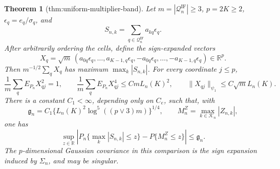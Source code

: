 \documentclass{article}
\newtheorem{theorem}{Theorem}
\begin{document}
\begin{theorem}[thm:uniform-multiplier-band]\label{thm:uniform-multiplier-band}
Let \(m=|\mathcal Q_n^{\mathrm{IF}}|\ge3\), \(p=2K\ge2\),
\(\epsilon_q=e_q/\sigma_q\), and
\[
 S_{n,k}=\sum_{q\in\mathcal Q_n^{\mathrm{IF}}}a_{kq}\epsilon_q.
\]
After arbitrarily ordering the cells, define the sign-expanded vectors
\[
 X_q=\sqrt m\,(a_{0q}\epsilon_q,\ldots,
 a_{K-1,q}\epsilon_q,-a_{0q}\epsilon_q,\ldots,
 -a_{K-1,q}\epsilon_q)\in\mathbb R^p.
\]
Then \(m^{-1/2}\sum_qX_q\) has maximum
\(\max_k|S_{n,k}|\).  For every coordinate \(j\le p\),
\[
 \frac1m\sum_qE_{P_n}X_{qj}^2=1,
 \qquad
 \frac1m\sum_qE_{P_n}X_{qj}^4
 \le C mL_n(K)^2,
 \qquad
 \|X_{qj}\|_{\psi_1}\le C\sqrt mL_n(K).
\]
There is a constant \(C_1<\infty\), depending only on \(C_e\), such
that, with
\[
 \mathfrak g_n=C_1\{L_n(K)^2\log^5((p\vee3)m)\}^{1/4},
 \qquad M_n^Z=\max_{k\in\mathcal K_n}|Z_{n,k}|,
\]
one has
\[
 \sup_{z\in\mathbb R}
 \left|P_n\{\max_k|S_{n,k}|\le z\}-P\{M_n^Z\le z\}\right|
 \le\mathfrak g_n.
\]
The \(p\)-dimensional Gaussian covariance in this comparison is the
sign expansion induced by \(\Sigma_n\), and may be singular.


\end{theorem}
\end{document}
